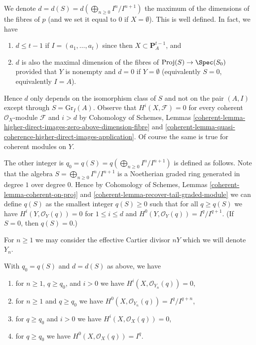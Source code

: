 \medskip\noindent
We denote $d = d(S) = d(\bigoplus_{n \geq 0} I^n/I^{n + 1})$
the maximum of the dimensions of the fibres of $p$
(and we set it equal to $0$ if $X = \emptyset$).
This is well defined. In fact, we have
\begin{enumerate}
\item $d \leq t - 1$ if $I = (a_1, \ldots, a_t)$ since then
$X \subset \mathbf{P}^{t - 1}_A$, and
\item $d$ is also the maximal dimension of the fibres of
$\text{Proj}(S) \to \Spec(S_0)$ provided that $Y$
is nonempty and $d = 0$ if $Y = \emptyset$
(equivalently $S = 0$, equivalently $I = A$).
\end{enumerate}
Hence $d$ only depends on the isomorphism class of $S$ and not on
the pair $(A, I)$ except through $S = \text{Gr}_I(A)$.
Observe that $H^i(X, \mathcal{F}) = 0$ for every coherent
$\mathcal{O}_X$-module $\mathcal{F}$ and $i > d$ by
Cohomology of Schemes, Lemmas
\ref{coherent-lemma-higher-direct-images-zero-above-dimension-fibre} and
\ref{coherent-lemma-quasi-coherence-higher-direct-images-application}.
Of course the same is true for coherent modules on $Y$.

\medskip\noindent
The other integer is $q_0 = q(S) = q(\bigoplus_{n \geq 0} I^n/I^{n + 1})$
is defined as follows. Note that the algebra
$S = \bigoplus_{n \geq 0} I^n/I^{n + 1}$
is a Noetherian graded ring generated in degree $1$ over degree $0$.
Hence by
Cohomology of Schemes, Lemmas \ref{coherent-lemma-coherent-on-proj} and
\ref{coherent-lemma-recover-tail-graded-module} we can define $q(S)$
as the smallest integer $q(S) \geq 0$ such that for all $q \geq q(S)$ we have
$H^i(Y, \mathcal{O}_Y(q)) = 0$ for $1 \leq i \leq d$ and
$H^0(Y, \mathcal{O}_Y(q)) = I^q/I^{q + 1}$.
(If $S = 0$, then $q(S) = 0$.)

\medskip\noindent
For $n \geq 1$ we may consider the effective Cartier divisor $nY$
which we will denote $Y_n$.

\begin{lemma}
\label{lemma-bound-q-and-d}
With $q_0 = q(S)$ and $d = d(S)$ as above, we have
\begin{enumerate}
\item for $n \geq 1$, $q \geq q_0$, and $i > 0$ we have
$H^i(X, \mathcal{O}_{Y_n}(q)) = 0$,
\item for $n \geq 1$ and $q \geq q_0$ we have
$H^0(X, \mathcal{O}_{Y_n}(q)) = I^q/I^{q + n}$,
\item for $q \geq q_0$ and $i > 0$ we have
$H^i(X, \mathcal{O}_X(q)) = 0$,
\item for $q \geq q_0$ we have
$H^0(X, \mathcal{O}_X(q)) = I^q$.
\end{enumerate}
\end{lemma}

